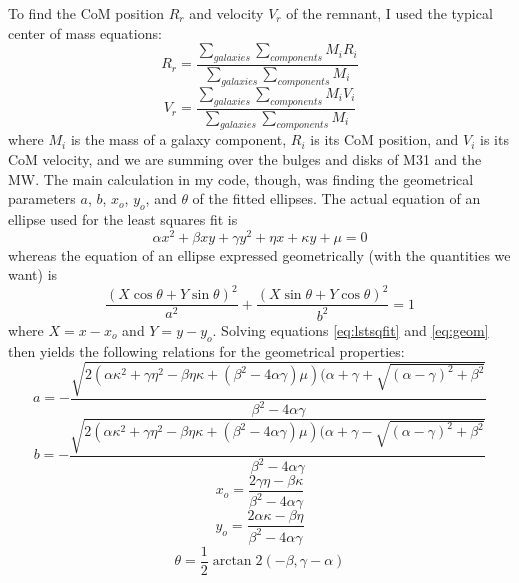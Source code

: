 \documentclass[twocolumn]{aastex631}
\begin{document}
To find the CoM position $R_r$ and velocity $V_r$ of the remnant, I used the typical center of mass equations:
\begin{equation} \label{eq:comR}
    R_r = \frac{\sum_{galaxies}\sum_{components}M_iR_i}{\sum_{galaxies}\sum_{components}M_i}
\end{equation}
\begin{equation} \label{eq:comV}
    V_r = \frac{\sum_{galaxies}\sum_{components}M_iV_i}{\sum_{galaxies}\sum_{components}M_i}
\end{equation}
where $M_i$ is the mass of a galaxy component, $R_i$ is its CoM position, and $V_i$ is its CoM velocity, and we are summing over the bulges and disks of M31 and the MW.
The main calculation in my code, though, was finding the geometrical parameters $a$, $b$, $x_o$, $y_o$, and $\theta$ of the fitted ellipses.
The actual equation of an ellipse used for the least squares fit is 
\begin{equation}\label{eq:lstsqfit}
    \alpha x^2 + \beta xy + \gamma y^2 + \eta x + \kappa y + \mu = 0
\end{equation}
whereas the equation of an ellipse expressed geometrically (with the quantities we want) is 
\begin{equation}\label{eq:geom}
    \frac{(X\cos\theta+Y\sin\theta)^2}{a^2} + \frac{(X\sin\theta+Y\cos\theta)^2}{b^2} = 1 
\end{equation}
where $X=x-x_o$ and $Y=y-y_o$.
Solving equations \ref{eq:lstsqfit} and \ref{eq:geom} then yields the following relations for the geometrical properties:
\begin{equation}\label{eq:a}
    a = - \frac{\sqrt{2(\alpha\kappa^2+\gamma\eta^2 - \beta\eta\kappa + (\beta^2 - 4\alpha\gamma)\mu)(\alpha+\gamma + \sqrt{(\alpha-\gamma)^2+\beta^2}}}{\beta^2-4\alpha\gamma}
\end{equation}
\begin{equation}\label{eq:b}
    b = -\frac{\sqrt{2(\alpha\kappa^2+\gamma\eta^2 - \beta\eta\kappa + (\beta^2 - 4\alpha\gamma)\mu)(\alpha+\gamma - \sqrt{(\alpha-\gamma)^2+\beta^2}}}{\beta^2-4\alpha\gamma}
\end{equation}
\begin{equation}\label{eq:xo}
    x_o = \frac{2\gamma\eta - \beta\kappa}{\beta^2 - 4\alpha\gamma}
\end{equation}
\begin{equation}\label{eq:yo}
    y_o = \frac{2\alpha\kappa - \beta\eta}{\beta^2 - 4\alpha\gamma}
\end{equation}
\begin{equation}\label{eq:theta}
    \theta = \frac{1}{2}\arctan2(-\beta,\gamma-\alpha)
\end{equation}
\end{document}
